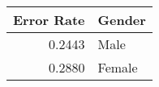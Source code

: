 
\begin{tabular}{r|l}
\hline
Error Rate & Gender\\
\hline
0.2443 & Male\\
\hline
0.2880 & Female\\
\hline
\end{tabular}
